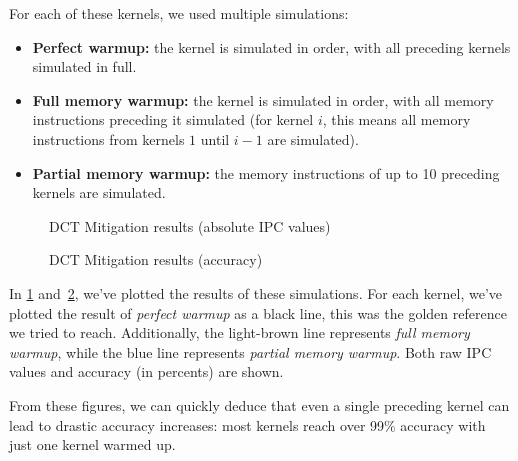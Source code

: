 For each of these kernels, we used multiple simulations:
\begin{itemize}
    \item \textbf{Perfect warmup:} the kernel is simulated in order, with all preceding kernels simulated in full.
    \item \textbf{Full memory warmup:} the kernel is simulated in order, with all memory instructions preceding it simulated (for kernel $i$, this means all memory instructions from kernels $1$ until $i - 1$ are simulated).
    \item \textbf{Partial memory warmup:} the memory instructions of up to 10 preceding kernels are simulated.
\end{itemize}

\begin{figure}
    \centering
    \resizebox{0.45\textwidth}{!}{}
    \resizebox{0.45\textwidth}{!}{}
    \resizebox{0.45\textwidth}{!}{}
    \resizebox{0.45\textwidth}{!}{}
    
    \caption{DCT Mitigation results (absolute IPC values)}
    \label{fig:mitig_abs}
\end{figure}

\begin{figure}
    \centering
    \resizebox{0.45\textwidth}{!}{}
    \resizebox{0.45\textwidth}{!}{}
    \resizebox{0.45\textwidth}{!}{}
    \resizebox{0.45\textwidth}{!}{}
    
    \caption{DCT Mitigation results (accuracy)}
    \label{fig:mitig_acc}
\end{figure}

In \cref{fig:mitig_abs} and\ \ref{fig:mitig_acc}, we've plotted the results of these simulations.
For each kernel, we've plotted the result of \textit{perfect warmup} as a black line, this was the golden reference we tried to reach.
Additionally, the light-brown line represents \textit{full memory warmup}, while the blue line represents \textit{partial memory warmup}.
Both raw IPC values and accuracy (in percents) are shown.

From these figures, we can quickly deduce that even a single preceding kernel can lead to drastic accuracy increases: most kernels reach over 99\% accuracy with just one kernel warmed up.

